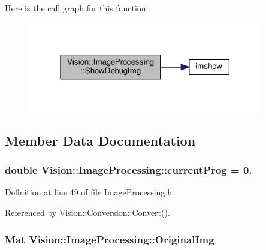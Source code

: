 Here is the call graph for this function\+:\nopagebreak
\begin{figure}[H]
\begin{center}
\leavevmode
\includegraphics[width=291pt]{class_vision_1_1_image_processing_a97407ef83de37496d30d6defe3165edd_cgraph}
\end{center}
\end{figure}




\subsection{Member Data Documentation}
\hypertarget{class_vision_1_1_image_processing_ac06b3b9501cde8e742aaf99d986af256}{}
\subsubsection[{current\+Prog}]{\setlength{\rightskip}{0pt plus 5cm}double Vision\+::\+Image\+Processing\+::current\+Prog = 0.}\label{class_vision_1_1_image_processing_ac06b3b9501cde8e742aaf99d986af256}


Definition at line 49 of file Image\+Processing.\+h.



Referenced by Vision\+::\+Conversion\+::\+Convert().

\hypertarget{class_vision_1_1_image_processing_a77c370dab270158a4e9c634e2d3f48e7}{}
\subsubsection[{Original\+Img}]{\setlength{\rightskip}{0pt plus 5cm}Mat Vision\+::\+Image\+Processing\+::\+Original\+Img}\label{class_vision_1_1_image_processing_a77c370dab270158a4e9c634e2d3f48e7}


